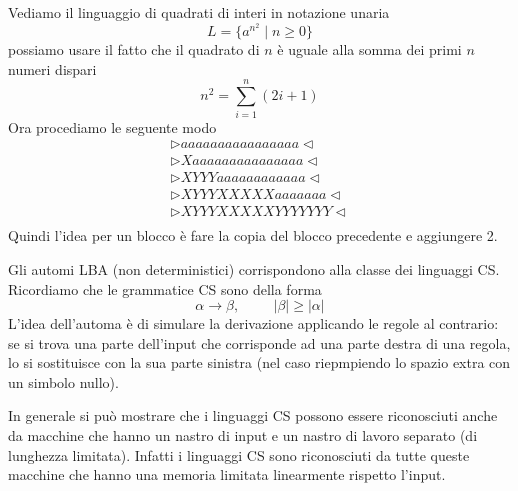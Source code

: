 \documentclass[12pt]{report}
\theoremstyle{definition}
\begin{document}
\begin{tcolorbox}[breakable]
	Vediamo il linguaggio di quadrati di interi in notazione unaria
	$$ L = \{ a^{n^2} \mid n \geq 0 \} $$
	possiamo usare il fatto che il quadrato di $n$ è uguale alla somma dei primi $n$ numeri dispari
	$$ n^2 = \sum_{i = 1}^n (2i + 1) $$
	Ora procediamo le seguente modo
	\begin{align*}
		\rhd aaaaaaaaaaaaaaaa \lhd \\
		\rhd Xaaaaaaaaaaaaaaa \lhd \\
		\rhd XYYYaaaaaaaaaaaa \lhd \\
		\rhd XYYYXXXXXaaaaaaa \lhd \\
		\rhd XYYYXXXXXYYYYYYY \lhd \\
	\end{align*}
	Quindi l'idea per un blocco è fare la copia del blocco precedente e aggiungere 2.
\end{tcolorbox}

Gli automi LBA (non deterministici) corrispondono alla classe dei linguaggi CS.
Ricordiamo che le grammatice CS sono della forma
$$ \alpha \rightarrow \beta, \hspace{1cm} |\beta| \geq |\alpha | $$
L'idea dell'automa è di simulare la derivazione applicando le regole al contrario: se si trova una parte dell'input che corrisponde ad una parte destra di una regola, lo si sostituisce con la sua parte sinistra (nel caso riepmpiendo lo spazio extra con un simbolo nullo).

In generale si può mostrare che i linguaggi CS possono essere riconosciuti anche da macchine che hanno un nastro di input e un nastro di lavoro separato (di lunghezza limitata).
Infatti i linguaggi CS sono riconosciuti da tutte queste macchine che hanno una memoria limitata linearmente rispetto l'input.
\end{document}
